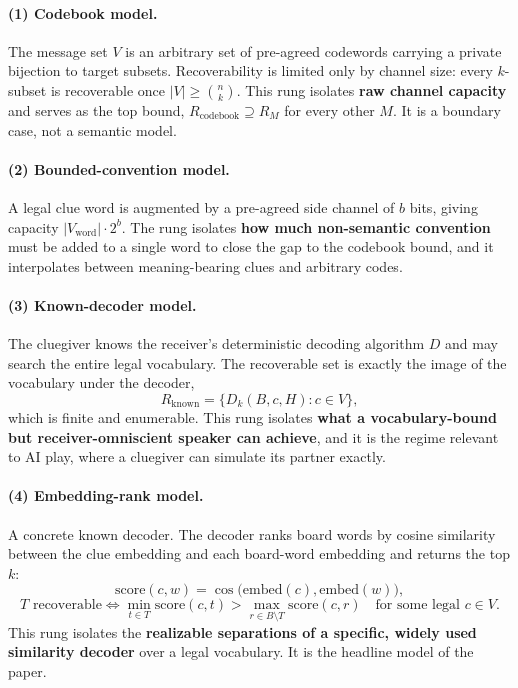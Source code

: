 \documentclass[11pt]{article}
\begin{document}
\paragraph{(1) Codebook model.}
The message set $V$ is an arbitrary set of pre-agreed codewords carrying a private
bijection to target subsets. Recoverability is limited only by channel size:
every $k$-subset is recoverable once $|V| \ge \binom{n}{k}$. This rung isolates
\textbf{raw channel capacity} and serves as the top bound,
$R_{\mathrm{codebook}} \supseteq R_M$ for every other $M$. It is a boundary case,
not a semantic model.

\paragraph{(2) Bounded-convention model.}
A legal clue word is augmented by a pre-agreed side channel of $b$ bits, giving
capacity $|V_{\mathrm{word}}| \cdot 2^b$. The rung isolates \textbf{how much
non-semantic convention} must be added to a single word to close the gap to the
codebook bound, and it interpolates between meaning-bearing clues and arbitrary
codes.

\paragraph{(3) Known-decoder model.}
The cluegiver knows the receiver's deterministic decoding algorithm $D$ and may
search the entire legal vocabulary. The recoverable set is exactly the image of
the vocabulary under the decoder,
\[
  R_{\mathrm{known}} = \{ D_k(B, c, H) : c \in V \},
\]
which is finite and enumerable. This rung isolates \textbf{what a
vocabulary-bound but receiver-omniscient speaker can achieve}, and it is the
regime relevant to AI play, where a cluegiver can simulate its partner exactly.

\paragraph{(4) Embedding-rank model.}
A concrete known decoder. The decoder ranks board words by cosine similarity
between the clue embedding and each board-word embedding and returns the top $k$:
\[
  \mathrm{score}(c, w) = \cos\!\big( \mathrm{embed}(c), \mathrm{embed}(w) \big),
\]
\[
  T \text{ recoverable} \iff
  \min_{t \in T} \mathrm{score}(c, t) > \max_{r \in B \setminus T} \mathrm{score}(c, r)
  \quad \text{for some legal } c \in V.
\]
This rung isolates the \textbf{realizable separations of a specific, widely used
similarity decoder} over a legal vocabulary. It is the headline model of the
paper.
\end{document}
